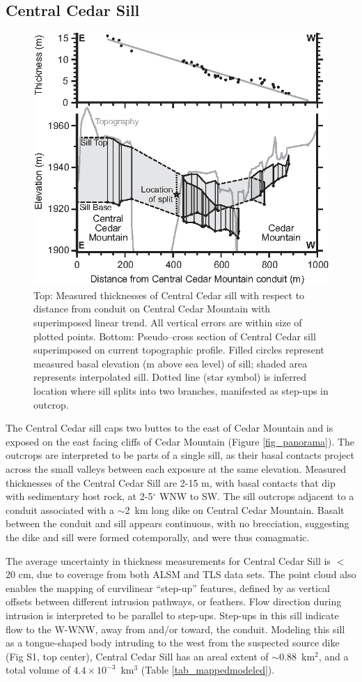 \documentclass[12pt,letter]{article}
\begin{document}
\subsection{Central Cedar Sill}

\begin{figure}
\centering
\includegraphics[width=0.5\linewidth]{figures/Fig4-chart}
\caption{Top: Measured thicknesses of Central Cedar sill with respect to distance from conduit on Central Cedar Mountain with superimposed linear trend. All vertical errors are within size of plotted points. Bottom: Pseudo–cross section of Central Cedar sill superimposed on current topographic profile. Filled circles represent measured basal elevation (m above sea level) of sill; shaded area represents interpolated sill. Dotted line (star symbol) is inferred location where sill splits into two branches, manifested as step-ups in outcrop.}
\label{fig_chart}
\end{figure}

The Central Cedar sill caps two buttes to the east of Cedar Mountain and is exposed on the east facing cliffs of Cedar Mountain (Figure \ref{fig_panorama}). The outcrops are interpreted to be parts of a single sill, as their basal contacts project across the small valleys between each exposure at the same elevation. Measured thicknesses of the Central Cedar Sill are 2-15 m, with basal contacts that dip with sedimentary host rock, at 2-5$^{\circ}$ WNW to SW. The sill outcrops adjacent to a conduit associated with a $\sim$2~km long dike on Central Cedar Mountain. Basalt between the conduit and sill appears continuous, with no brecciation, suggesting the dike and sill were formed cotemporally, and were thus comagmatic.

The average uncertainty in thickness measurements for Central Cedar Sill is $<$20 cm, due to coverage from both ALSM and TLS data sets. The point cloud also enables the mapping of curvilinear ``step-up'' features, defined by \citet{gartner1986geometry} as vertical offsets between different intrusion pathways, or feathers. Flow direction during intrusion is interpreted to be parallel to step-ups. Step-ups in this sill indicate flow to the W-WNW, away from and/or toward, the conduit. Modeling this sill as a tongue-shaped body intruding to the west from the suspected source dike (Fig S1, top center), Central Cedar Sill has an areal extent of $\sim$0.88~km$^2$, and a total volume of $4.4\times 10^{-3}$~km$^3$ (Table \ref{tab_mappedmodeled}).
\end{document}
